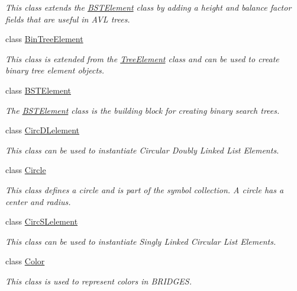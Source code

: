 \begin{DoxyCompactItemize}
\begin{DoxyCompactList}\small\item\em This class extends the \hyperlink{classbridges_1_1base_1_1_b_s_t_element}{B\+S\+T\+Element} class by adding a height and balance factor fields that are useful in A\+VL trees. \end{DoxyCompactList}\item 
class \hyperlink{classbridges_1_1base_1_1_bin_tree_element}{Bin\+Tree\+Element}
\begin{DoxyCompactList}\small\item\em This class is extended from the \hyperlink{classbridges_1_1base_1_1_tree_element}{Tree\+Element} class and can be used to create binary tree element objects. \end{DoxyCompactList}\item 
class \hyperlink{classbridges_1_1base_1_1_b_s_t_element}{B\+S\+T\+Element}
\begin{DoxyCompactList}\small\item\em The \hyperlink{classbridges_1_1base_1_1_b_s_t_element}{B\+S\+T\+Element} class is the building block for creating binary search trees. \end{DoxyCompactList}\item 
class \hyperlink{classbridges_1_1base_1_1_circ_d_lelement}{Circ\+D\+Lelement}
\begin{DoxyCompactList}\small\item\em This class can be used to instantiate Circular Doubly Linked List Elements. \end{DoxyCompactList}\item 
class \hyperlink{classbridges_1_1base_1_1_circle}{Circle}
\begin{DoxyCompactList}\small\item\em This class defines a circle and is part of the symbol collection. A circle has a center and radius. \end{DoxyCompactList}\item 
class \hyperlink{classbridges_1_1base_1_1_circ_s_lelement}{Circ\+S\+Lelement}
\begin{DoxyCompactList}\small\item\em This class can be used to instantiate Singly Linked Circular List Elements. \end{DoxyCompactList}\item 
class \hyperlink{classbridges_1_1base_1_1_color}{Color}
\begin{DoxyCompactList}\small\item\em This class is used to represent colors in B\+R\+I\+D\+G\+ES. \end{DoxyCompactList}\item 

\end{DoxyCompactItemize}
